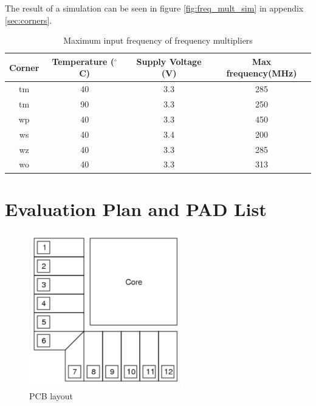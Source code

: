 \documentclass[a4paper,12pt]{article} \usepackage{graphicx}
\newcommand{\degree}{\ensuremath{^\circ}}
\begin{document}
The result of a simulation can be seen in figure \ref{fig:freq_mult_sim} in appendix
\ref{sec:corners}.
\begin{table}[h]
        \centering
        \begin{tabular}{|c|c|c|c|}
                \hline
        \textbf{Corner} & \textbf{Temperature (\degree C)} &
        \textbf{Supply Voltage (V)} & \textbf{Max frequency(MHz)} \\
        \hline
        tm & 40 & 3.3 & 285 \\
        tm & 90 & 3.3 & 250 \\
        wp & 40 & 3.3 & 450 \\
        ws & 40 & 3.4 & 200 \\
        wz & 40 & 3.3 & 285 \\
        wo & 40 & 3.3 & 313 \\

        \hline
\end{tabular}
\caption{Maximum input frequency of frequency multipliers}
\label{tab:freq_mult}
\end{table}

\newpage
\section{Evaluation Plan and PAD List}

\begin{figure} [h!]
\centering
\includegraphics[width=0.6\textwidth]{../Bilder/Layout/PCB.png}
\caption{PCB layout}
\label{fig:PCB}
\end{figure}
\end{document}
